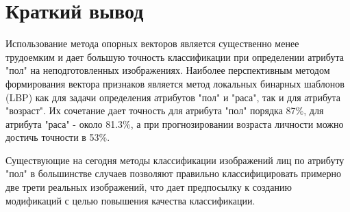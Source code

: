 \documentclass[12pt,a4paper]{article}
\begin{document}
\section{Краткий вывод}
Использование метода опорных векторов является существенно менее трудоемким и дает большую точность классификации при определении атрибута "пол" на неподготовленных изображениях. Наиболее перспективным методом формирования вектора признаков является метод локальных бинарных шаблонов (LBP) как для задачи определения
атрибутов "пол" и "раса", так и для атрибута "возраст". Их сочетание дает точность для атрибута "пол" порядка 87\%, для атрибута "раса" - около 81.3\%, а при прогнозировании возраста личности можно достичь точности в 53\%.

Существующие на сегодня методы классификации изображений лиц по атрибуту "пол" в большинстве случаев позволяют правильно классифицировать примерно две трети реальных изображений, что дает предпосылку к созданию модификаций с целью повышения качества классификации.
\end{document}
